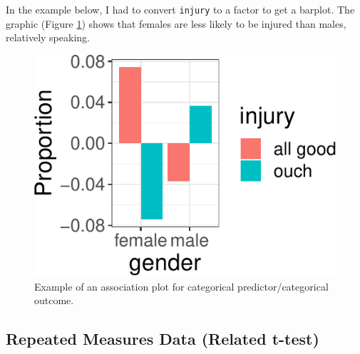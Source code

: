 \documentclass[
  man]{apa6}
\newenvironment{Shaded}{\begin{snugshade}}{\end{snugshade}}
\newcommand{\DataTypeTok}[1]{\textcolor[rgb]{0.13,0.29,0.53}{#1}}
\newcommand{\DecValTok}[1]{\textcolor[rgb]{0.00,0.00,0.81}{#1}}
\newcommand{\KeywordTok}[1]{\textcolor[rgb]{0.13,0.29,0.53}{\textbf{#1}}}
\newcommand{\NormalTok}[1]{#1}
\newcommand{\OperatorTok}[1]{\textcolor[rgb]{0.81,0.36,0.00}{\textbf{#1}}}
\newcommand{\StringTok}[1]{\textcolor[rgb]{0.31,0.60,0.02}{#1}}
\begin{document}
In the example below, I had to convert \texttt{injury} to a factor to get a barplot. The graphic (Figure \ref{fig:association}) shows that females are less likely to be injured than males, relatively speaking.

\begin{Shaded}
\end{Shaded}

\begin{figure}
\centering
\includegraphics{flexplot_psychmeth_files/figure-latex/association-1.pdf}
\caption{\label{fig:association}Example of an association plot for categorical predictor/categorical outcome.\label{fig:association}}
\end{figure}

\hypertarget{repeated-measures-data-related-t-test}{%
\subsection{Repeated Measures Data (Related t-test)}\label{repeated-measures-data-related-t-test}}
\end{document}
